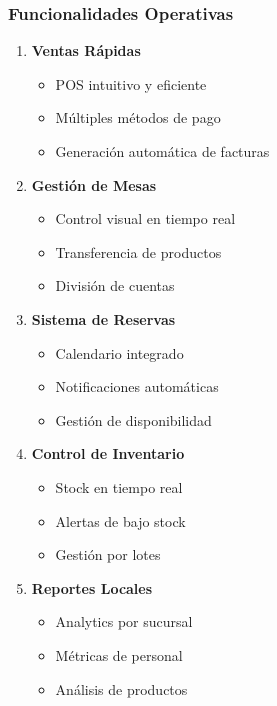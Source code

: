 \documentclass[12pt,a4paper]{article}
\begin{document}
\subsubsection{Funcionalidades Operativas}
\begin{enumerate}
    \item \textbf{Ventas Rápidas}
    \begin{itemize}
        \item POS intuitivo y eficiente
        \item Múltiples métodos de pago
        \item Generación automática de facturas
    \end{itemize}
    
    \item \textbf{Gestión de Mesas}
    \begin{itemize}
        \item Control visual en tiempo real
        \item Transferencia de productos
        \item División de cuentas
    \end{itemize}
    
    \item \textbf{Sistema de Reservas}
    \begin{itemize}
        \item Calendario integrado
        \item Notificaciones automáticas
        \item Gestión de disponibilidad
    \end{itemize}
    
    \item \textbf{Control de Inventario}
    \begin{itemize}
        \item Stock en tiempo real
        \item Alertas de bajo stock
        \item Gestión por lotes
    \end{itemize}
    
    \item \textbf{Reportes Locales}
    \begin{itemize}
        \item Analytics por sucursal
        \item Métricas de personal
        \item Análisis de productos
    \end{itemize}
\end{enumerate}
\end{document}

